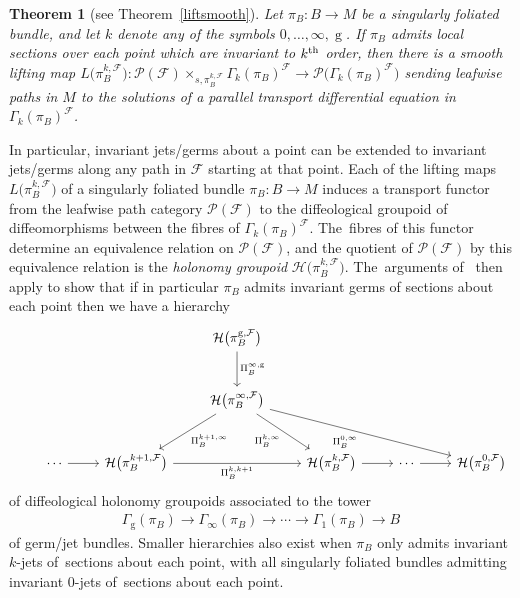 \documentclass[pdftex]{sigma}
\numberwithin{equation}{section}
\newtheorem{Theorem}{Theorem}[section]
\def\g{\operatorname{g}}
\def\FF{{\mathcal{F}}}
\def\HH{{\mathcal{H}}}
\def\PP{{\mathcal{P}}}
\begin{document}
\begin{Theorem}[see Theorem~\ref{liftsmooth}]
Let $\pi_{B}\colon B\rightarrow M$ be a singularly foliated bundle, and let $k$ denote any of the symbols $0,\dots,\infty,\g$. If $\pi_{B}$ admits local sections over each point which are invariant to $k^{\rm th}$ order, then there is a smooth lifting map $L\big(\pi_{B}^{k,\FF}\big)\colon \PP(\FF)\times_{s,\pi_{B}^{k,\FF}}\Gamma_{k}(\pi_{B})^{\FF}\rightarrow \PP\big(\Gamma_{k}(\pi_{B})^{\FF}\big)$ sending leafwise paths in $M$ to the solutions of a parallel transport differential equation in $\Gamma_{k}(\pi_{B})^{\FF}$.
\end{Theorem}

In particular, invariant jets/germs about a point can be extended to invariant jets/germs along any path in $\FF$ starting at that point. Each of the lifting maps $L\big(\pi_{B}^{k,\FF}\big)$ of a singularly foliated bundle $\pi_{B}\colon B\rightarrow M$ induces a transport functor from the leafwise path category $\PP(\FF)$ to the diffeological groupoid of diffeomorphisms between the fibres of $\Gamma_{k}(\pi_{B})^{\FF}$. The~fibres of this functor determine an equivalence relation on $\PP(\FF)$, and the quotient of $\PP(\FF)$ by this equivalence relation is the \textit{holonomy groupoid} $\HH\big(\pi_{B}^{k,\FF}\big)$. The~arguments of~\cite[Theorem~5.15]{mac3} then apply to show that if in particular $\pi_{B}$ admits invariant germs of sections about each point then we have a hierarchy
\begin{equation}\label{hierintro}
\begin{tikzcd}[row sep = large]
& & & \HH\big(\pi_{B}^{\g,\FF}\big) \ar[d,"\Pi_{B}^{\infty,\g}"] & & & \\ & & & \HH\big(\pi_{B}^{\infty,\FF}\big) \ar[dl,"\Pi_{B}^{k+1,\infty}"] \ar[dr,"\Pi_{B}^{k,\infty}"'] \ar[drrr,"\Pi_{B}^{0,\infty}"'] & & &\\ & \cdots\ar[r] & \HH\big(\pi_{B}^{k+1,\FF}\big) \ar[rr,"\Pi_{B}^{k,k+1}"'] & & \HH\big(\pi_{B}^{k,\FF}\big) \ar[r] & \cdots \ar[r] & \HH\big(\pi_{B}^{0,\FF}\big)
\end{tikzcd}
\end{equation}
of diffeological holonomy groupoids associated to the tower
\begin{gather*}
\Gamma_{\g}(\pi_{B})\rightarrow\Gamma_{\infty}(\pi_{B})\rightarrow\cdots\rightarrow \Gamma_{1}(\pi_{B})\rightarrow B
\end{gather*}
of germ/jet bundles. Smaller hierarchies also exist when $\pi_{B}$ only admits invariant $k$-jets of~sections about each point, with all singularly foliated bundles admitting invariant $0$-jets of~sections about each point.
\end{document}
